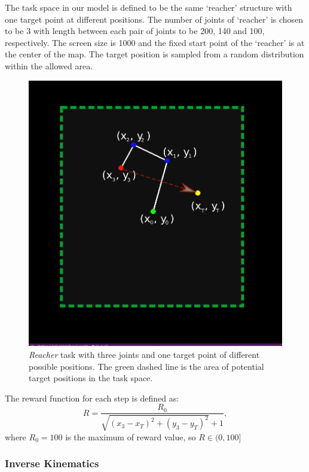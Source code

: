\documentclass{article}
\begin{document}
The task space in our model is defined to be the same `reacher' structure with one target point at different positions. The number of joints of `reacher' is chosen to be 3 with length between each pair of joints to be 200, 140 and 100, respectively. The screen size is 1000 and the fixed start point of the `reacher' is at the center of the map. The target position is sampled from a random distribution within the allowed area.
\begin{figure}[htbp]
	\centering
	\includegraphics[scale=0.3]{img/reacher1.png}
	\caption{\textit{Reacher} task with three joints and one target point of different possible positions. The green dashed line is the area of potential target positions in the task space.}
	\label{fig:universe}
\end{figure}
The reward function for each step is defined as:
\begin{equation}
 R=\frac{R_0}{\sqrt{(x_3-x_T)^2+(y_3-y_T)^2}+1}, 
\end{equation}
where $R_0=100$ is the maximum of reward value, so $R\in(0,100]$

\subsubsection{Inverse Kinematics}
\end{document}
